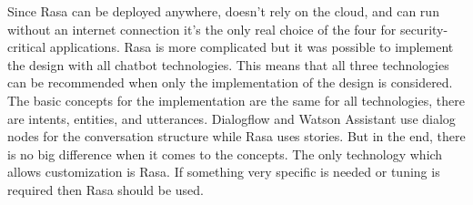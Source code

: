Since Rasa can be deployed anywhere, doesn't rely on the cloud, and can run without an
internet connection it's the only real choice of the four for security-critical applications.
Rasa is more complicated but it was possible to implement the design with all chatbot technologies.
This means that all three technologies can be recommended when only the implementation of the design
is considered.
The basic concepts for the implementation are the same for all technologies, there are intents,
entities, and utterances.
Dialogflow and Watson Assistant use dialog nodes for the conversation structure while Rasa 
uses stories. 
But in the end, there is no big difference when it comes to the concepts.
The only technology which allows customization is Rasa.
If something very specific is needed or tuning is required then Rasa should be used.


